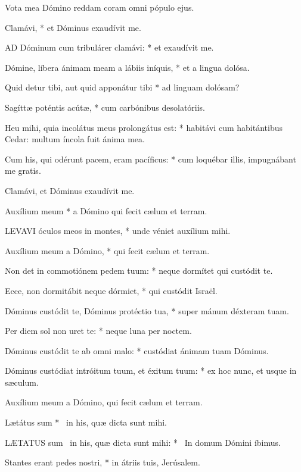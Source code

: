  Vota mea Dómino reddam coram omni pópulo ejus.

 Clamávi, * et Dóminus exaudívit me.


\lettrine[lines=2]{A}{D} Dóminum cum tribulárer clamávi: * et exaudívit me.

Dómine, líbera ánimam meam a lábiis iníquis, * et a lingua dolósa.

Quid detur tibi, aut quid apponátur tibi * ad linguam dolósam?

Sagíttæ poténtis acútæ, * cum carbónibus desolatóriis.

Heu mihi, quia incolátus meus prolongátus est: * habitávi cum habitántibus Cedar: multum íncola fuit ánima mea.

Cum his, qui odérunt pacem, eram pacíficus: * cum loquébar illis, impugnábant me gratis.

 Clamávi, et Dóminus exaudívit me.

 Auxílium meum * a Dómino qui fecit cælum et terram.


\lettrine[lines=2]{L}{EVAVI} óculos meos in montes, * unde véniet auxílium mihi.

Auxílium meum a Dómino, * qui fecit cælum et terram.

Non det in commotiónem pedem tuum: * neque dormítet qui custódit te.

Ecce, non dormitábit neque dórmiet, * qui custódit Israël.

Dóminus custódit te, Dóminus protéctio tua, * super mánum déxteram tuam.

Per diem sol non uret te: * neque luna per noctem.

Dóminus custódit te ab omni malo: * custódiat ánimam tuam Dóminus.

Dóminus custódiat intróitum tuum, et éxitum tuum: * ex hoc nunc, et usque in sæculum.

 Auxílium meum a Dómino, qui fecit cælum et terram.

 Lætátus sum * \textdagger\ in his, quæ dicta sunt mihi. \textdaggerdbl


\lettrine[lines=2]{L}{ÆTATUS} sum \textdagger\ in his, quæ dicta sunt mihi: * \textdaggerdbl\ In domum Dómini íbimus.

Stantes erant pedes nostri, * in átriis tuis, Jerúsalem.

